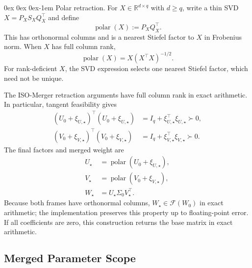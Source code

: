 \documentclass[11pt, a4paper]{utda}
\makeatletter
\renewcommand{\paragraph}{%
  \@startsection{paragraph}{4}%
  {\z@}{0ex \@plus 0ex \@minus 0ex}{-1em}%
  {\normalfont\normalsize\bfseries}%
}
\theoremstyle{plain}
\theoremstyle{definition}
\theoremstyle{remark}
\makeatother
\begin{document}
\paragraph{Polar retraction.}
For $X\in\mathbb R^{d\times q}$ with $d\geq q$, write a thin
SVD $X=P_XS_XQ_X^\top$ and define
\begin{equation}
\label{eq:polar_retraction}
    \operatorname{polar}(X):=P_XQ_X^\top.
\end{equation}
This has orthonormal columns and is a nearest Stiefel factor to $X$
in Frobenius norm.
When $X$ has full column rank,
\begin{equation}
\label{eq:app_polar_inverse_sqrt}
    \operatorname{polar}(X)=X(X^\top X)^{-1/2}.
\end{equation}
For rank-deficient $X$, the SVD expression selects one nearest
Stiefel factor, which need not be unique.

The ISO-Merger retraction arguments have full column rank in
exact arithmetic. In particular, tangent feasibility gives
\begin{equation}
\label{eq:app_iso_merger_full_rank}
\begin{aligned}
    (U_0+\xi_{U,\star})^\top(U_0+\xi_{U,\star})
    &=I_q+\xi_{U,\star}^\top\xi_{U,\star}\succ0,\\
    (V_0+\xi_{V,\star})^\top(V_0+\xi_{V,\star})
    &=I_q+\xi_{V,\star}^\top\xi_{V,\star}\succ0.
\end{aligned}
\end{equation}
The final factors and merged weight are
\begin{equation}
\label{eq:iso_merger_output}
\begin{aligned}
    U_\star&=\operatorname{polar}(U_0+\xi_{U,\star}),\\
    V_\star&=\operatorname{polar}(V_0+\xi_{V,\star}),\\
    W_\star&=U_\star\Sigma_0V_\star^\top.
\end{aligned}
\end{equation}
Because both frames have orthonormal columns,
$W_\star\in\mathcal F(W_0)$ in exact arithmetic; the
implementation preserves this property up to floating-point error.
If all coefficients are zero, this construction returns the base
matrix in exact arithmetic.

\subsection{Merged Parameter Scope}
\label{app:iso_merger_scope}
\end{document}
